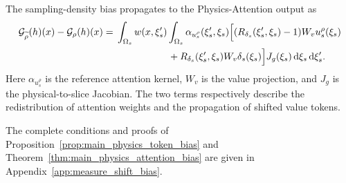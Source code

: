 \begin{theorem}
\label{thm:main_physics_attention_bias}
The sampling-density bias propagates to the Physics-Attention output as
\begin{align}
    \mathcal{G}_{\widetilde{\rho}}(h)(x)-\mathcal{G}_{\rho}(h)(x)
    ={}&\int_{\Omega_s}w(x,\xi_s')
    \int_{\Omega_s}\alpha_{u_s^{\rho}}(\xi_s',\xi_s)
    \Big[(R_{\delta_s}(\xi_s',\xi_s)-1)W_vu_s^{\rho}(\xi_s)
    \nonumber\\
    &\hspace{19mm}+R_{\delta_s}(\xi_s',\xi_s)W_v\delta_s(\xi_s)\Big]
    J_g(\xi_s)\,\mathrm{d}\xi_s\,\mathrm{d}\xi_s'.
    \label{eq:main_physics_attention_bias}
\end{align}
Here $\alpha_{u_s^{\rho}}$ is the reference attention kernel, $W_v$ is the value projection, and $J_g$ is the physical-to-slice Jacobian. The two terms respectively describe the redistribution of attention weights and the propagation of shifted value tokens.
\end{theorem}

The complete conditions and proofs of Proposition~\ref{prop:main_physics_token_bias} and Theorem~\ref{thm:main_physics_attention_bias} are given in Appendix~\ref{app:measure_shift_bias}.

